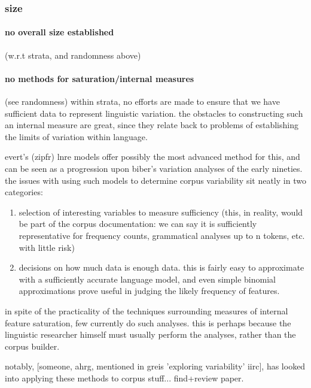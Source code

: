 \subsubsection{size}

\paragraph{ no overall size established }
(w.r.t strata, and randomness above)

\paragraph{ no methods for saturation/internal measures}
(see randomness)
within strata, no efforts are made to ensure that we have sufficient data to represent linguistic variation.  the obstacles to constructing such an internal measure are great, since they relate back to problems of establishing the limits of variation within language.

evert's (zipfr) lnre models offer possibly the most advanced method for this, and can be seen as a progression upon biber's variation analyses of the early nineties.  the issues with using such models to determine corpus variability sit neatly in two categories:

\begin{enumerate}
 \item selection of interesting variables to measure sufficiency (this, in reality, would be part of the corpus documentation: we can say it is sufficiently representative for frequency counts, grammatical analyses up to n tokens, etc. with little risk)
 \item decisions on how much data is enough data.  this is fairly easy to approximate with a sufficiently accurate language model, and even simple binomial approximations prove useful in judging the likely frequency of features.
\end{enumerate}

in spite of the practicality of the techniques surrounding measures of internal feature saturation, few currently do such analyses.  this is perhaps because the linguistic researcher himself must usually perform the analyses, rather than the corpus builder.

notably, [someone, ahrg, mentioned in greis 'exploring variability' iirc], has looked into applying these methods to corpus stuff... find+review paper.



